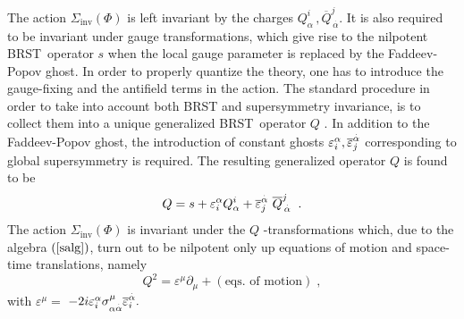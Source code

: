 \documentclass[a4paper,12pt]{article}
\begin{document}
The action $\Sigma _{\mathrm{inv}}(\Phi )$ is left invariant by the charges $%
Q_{\alpha }^{i}\,,\overline{Q}_{\,\stackrel{.}{\alpha }}^{j}$. It is also
required to be invariant under gauge transformations, which give rise to the
nilpotent BRST\ operator $s$ when the local gauge parameter is replaced by
the Faddeev-Popov ghost. In order to properly quantize the theory, one has
to introduce the gauge-fixing and the antifield terms in the action. The
standard procedure in order to take into account both BRST and supersymmetry
invariance, is to collect them into a unique generalized BRST\ operator $Q$ 
\cite{n4,mg,mp}$.$ In addition to the Faddeev-Popov ghost, the introduction
of constant ghosts $\varepsilon _{i}^{\alpha },\overline{\varepsilon }_{j}^{%
\stackrel{.}{\alpha }}$ corresponding to global supersymmetry is required.
The resulting generalized operator $Q$ is found to be 
\begin{equation}
Q=s+\varepsilon _{i}^{\alpha }Q_{\alpha }^{i}+\overline{\varepsilon }_{j}^{%
\stackrel{.}{\alpha }}\ \overline{Q}_{\,\stackrel{.}{\alpha }}^{j}\;\;.
\label{q-op}
\end{equation}
The action $\Sigma _{\mathrm{inv}}(\Phi )$ is invariant under the $Q$%
-transformations which, due to the algebra $\left( \ref{salg}\right) $, turn
out to be nilpotent only up equations of motion and space-time translations,
namely 
\begin{equation}
Q^{2}=\varepsilon ^{\mu }\partial _{\mu }+\mathrm{(eqs.\,\,of\,\,motion)\;,}
\label{snil}
\end{equation}
with $\varepsilon ^{\mu }=$ $-2i\varepsilon _{i}^{\alpha }\sigma _{\alpha 
\stackrel{.}{\alpha }}^{\mu }\overline{\varepsilon }_{i}^{\stackrel{.}{%
\alpha }}.$
\end{document}
